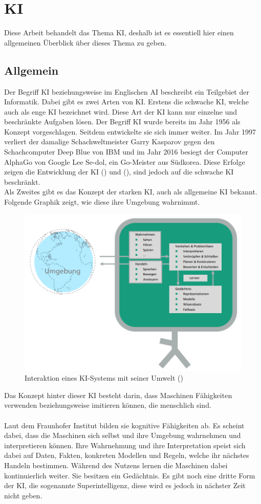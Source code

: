 \documentclass[12pt,toc=bib,toc=listof]{scrreprt}
\begin{document}
\section{KI} %
\label{sec:KI}
Diese Arbeit behandelt das Thema KI, deshalb ist es essentiell hier einen allgemeinen Überblick über dieses Thema zu geben.

\subsection{Allgemein} %
\label{sec:allgemein}
Der Begriff KI beziehungsweise im Englischen AI beschreibt ein Teilgebiet der Informatik. Dabei gibt es zwei Arten von KI. Erstens die schwache KI, welche auch als enge KI bezeichnet wird. Diese Art der KI kann nur einzelne und beschränkte Aufgaben lösen. Der Begriff KI wurde bereits im Jahr 1956 als Konzept vorgeschlagen. Seitdem entwickelte sie sich immer weiter. Im Jahr 1997 verliert der damalige Schachweltmeister Garry Kasparov gegen den Schachcomputer Deep Blue von IBM und im Jahr 2016 besiegt der Computer AlphaGo von Google Lee Se-dol, ein Go-Meister aus Südkorea. Diese Erfolge zeigen die Entwicklung der KI (\cite{Hecker2018}) und (\cite{Roscher2025}), sind jedoch auf die schwache KI beschränkt.\\
Als Zweites gibt es das Konzept der starken KI, auch als allgemeine KI bekannt. Folgende Graphik zeigt, wie diese ihre Umgebung wahrnimmt.
\begin{figure} [H]
    \centering
    \includegraphics[width=0.75\linewidth]{./Bilder/Fraunhofer_KI-Umgebung.png}
    \caption{Interaktion eines KI-Systems mit seiner Umwelt (\cite{Hecker2018})}
    \label{fig:enter-label}
\end{figure}
\noindent Das Konzept hinter dieser KI besteht darin, dass Maschinen Fähigkeiten verwenden beziehungsweise imitieren können, die menschlich sind.\\
\\
Laut dem Fraunhofer Institut bilden sie kognitive Fähigkeiten ab.
Es scheint dabei, dass die Maschinen sich selbst und ihre Umgebung wahrnehmen und interpretieren können. Ihre Wahrnehmung und ihre Interpretation speist sich dabei auf Daten, Fakten, konkreten Modellen und Regeln, welche ihr nächstes Handeln bestimmen. Während des Nutzens lernen die Maschinen dabei kontinuierlich weiter. Sie besitzen ein Gedächtnis. Es gibt noch eine dritte Form der KI, die sogenannte Superintelligenz, diese wird es jedoch in nächster Zeit nicht geben.
\end{document}
